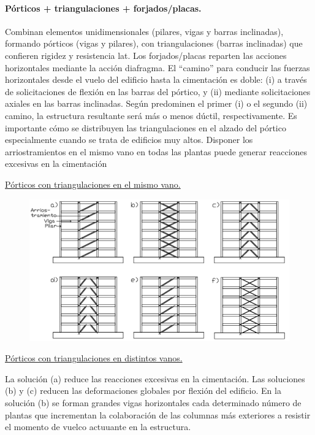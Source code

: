 \paragraph{Pórticos + triangulaciones + forjados/placas.}
Combinan elementos unidimensionales (pilares, vigas y barras inclinadas), formando pórticos (vigas y pilares), con triangulaciones (barras inclinadas) que confieren rigidez y resistencia lat. Los forjados/placas reparten las acciones horizontales mediante la acción diafragma. El ``camino'' para conducir las fuerzas horizontales desde el vuelo del edificio hasta la cimentación es doble: (i) a través de solicitaciones de flexión en las barras del pórtico, y (ii) mediante solicitaciones axiales en las barras inclinadas. Según predominen el primer (i) o el segundo (ii) camino, la estructura resultante será más o menos dúctil, respectivamente. Es importante cómo se distribuyen las triangulaciones en el alzado del pórtico especialmente cuando se trata de edificios muy altos. Disponer los arriostramientos en el mismo vano en todas las plantas puede generar reacciones excesivas en la cimentación

\noindent \underline{Pórticos con triangulaciones en el mismo vano.}
\begin{figure}[H]
    \centering
    \includegraphics[width=1\linewidth]{Imagenes/Porticos con triangulaciones en el mismo vano.png}
\end{figure}

\noindent \underline{Pórticos con triangulaciones en distintos vanos.}

La solución (a) reduce las reacciones excesivas en la cimentación. Las soluciones (b) y (c) reducen las deformaciones globales por flexión del edificio. En la solución (b) se forman grandes vigas horizontales cada determinado número de plantas que incrementan la colaboración de las columnas más exteriores a resistir el momento de vuelco actuuante en la estructura.

